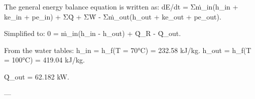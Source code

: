 The general energy balance equation is written as:  
dE/dt = Σṁ_in(h_in + ke_in + pe_in) + ΣQ̇ + ΣẆ - Σṁ_out(h_out + ke_out + pe_out).  

Simplified to:  
0 = ṁ_in(h_in - h_out) + Q̇_R - Q̇_out.  

From the water tables:  
h_in = h_f(T = 70°C) = 232.58 kJ/kg.  
h_out = h_f(T = 100°C) = 419.04 kJ/kg.  

Q̇_out = 62.182 kW.  

---